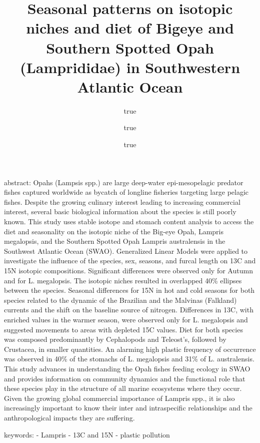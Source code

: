 \documentclass[
]{article}
\title{Seasonal patterns on isotopic niches and diet of Bigeye and
Southern Spotted Opah (Lamprididae) in Southwestern Atlantic Ocean}
\author{true \and true \and true}
\date{}
\begin{document}
\maketitle

abstract: \textbar{} Opahs (Lampsis spp.) are large deep-water
epi-mesopelagic predator fishes captured worldwide as bycatch of
longline fisheries targeting large pelagic fishes. Despite the growing
culinary interest leading to increasing commercial interest, several
basic biological information about the species is still poorly known.
This study uses stable isotope and stomach content analysis to access
the diet and seasonality on the isotopic niche of the Big-eye Opah,
Lampris megalopsis, and the Southern Spotted Opah Lampris australensis
in the Southwest Atlantic Ocean (SWAO). Generalized Linear Models were
applied to investigate the influence of the species, sex, seasons, and
furcal length on 13C and 15N isotopic compositions. Significant
differences were observed only for Autumn and for L. megalopsis. The
isotopic niches resulted in overlapped 40\% ellipses between the
species. Seasonal differences for 15N in hot and cold seasons for both
species related to the dynamic of the Brazilian and the Malvinas
(Falkland) currents and the shift on the baseline source of nitrogen.
Differences in 13C, with enriched values in the warmer season, were
observed only for L. megalopsis and suggested movements to areas with
depleted 15C values. Diet for both species was composed predominantly by
Cephalopods and Teleost's, followed by Crustacea, in smaller quantities.
An alarming high plastic frequency of occurrence was observed in 40\% of
the stomachs of L. megalopsis and 31\% of L. australensis. This study
advances in understanding the Opah fishes feeding ecology in SWAO and
provides information on community dynamics and the functional role that
these species play in the structure of all marine ecosystems where they
occur. Given the growing global commercial importance of Lampris spp.,
it is also increasingly important to know their inter and intraspecific
relationships and the anthropological impacts they are suffering.

keywords: - Lampris - 13C and 15N - plastic pollution
\end{document}
